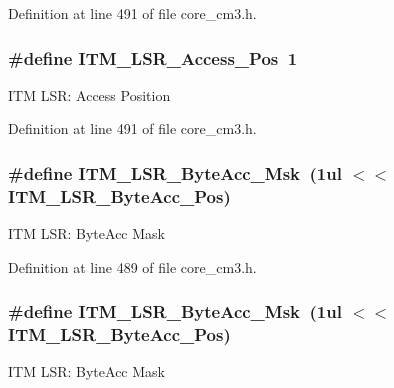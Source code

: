 Definition at line 491 of file core\+\_\+cm3.\+h.

\subsubsection[{\texorpdfstring{I\+T\+M\+\_\+\+L\+S\+R\+\_\+\+Access\+\_\+\+Pos}{ITM_LSR_Access_Pos}}]{\setlength{\rightskip}{0pt plus 5cm}\#define I\+T\+M\+\_\+\+L\+S\+R\+\_\+\+Access\+\_\+\+Pos~1}\hypertarget{group___c_m_s_i_s___c_m3___i_t_m_ga144a49e12b83ad9809fdd2769094fdc0}{}\label{group___c_m_s_i_s___c_m3___i_t_m_ga144a49e12b83ad9809fdd2769094fdc0}
I\+TM L\+SR\+: Access Position 

Definition at line 491 of file core\+\_\+cm3.\+h.

\subsubsection[{\texorpdfstring{I\+T\+M\+\_\+\+L\+S\+R\+\_\+\+Byte\+Acc\+\_\+\+Msk}{ITM_LSR_ByteAcc_Msk}}]{\setlength{\rightskip}{0pt plus 5cm}\#define I\+T\+M\+\_\+\+L\+S\+R\+\_\+\+Byte\+Acc\+\_\+\+Msk~(1ul $<$$<$ I\+T\+M\+\_\+\+L\+S\+R\+\_\+\+Byte\+Acc\+\_\+\+Pos)}\hypertarget{group___c_m_s_i_s___c_m3___i_t_m_ga91f492b2891bb8b7eac5b58de7b220f4}{}\label{group___c_m_s_i_s___c_m3___i_t_m_ga91f492b2891bb8b7eac5b58de7b220f4}
I\+TM L\+SR\+: Byte\+Acc Mask 

Definition at line 489 of file core\+\_\+cm3.\+h.

\subsubsection[{\texorpdfstring{I\+T\+M\+\_\+\+L\+S\+R\+\_\+\+Byte\+Acc\+\_\+\+Msk}{ITM_LSR_ByteAcc_Msk}}]{\setlength{\rightskip}{0pt plus 5cm}\#define I\+T\+M\+\_\+\+L\+S\+R\+\_\+\+Byte\+Acc\+\_\+\+Msk~(1ul $<$$<$ I\+T\+M\+\_\+\+L\+S\+R\+\_\+\+Byte\+Acc\+\_\+\+Pos)}\hypertarget{group___c_m_s_i_s___c_m3___i_t_m_ga91f492b2891bb8b7eac5b58de7b220f4}{}\label{group___c_m_s_i_s___c_m3___i_t_m_ga91f492b2891bb8b7eac5b58de7b220f4}
I\+TM L\+SR\+: Byte\+Acc Mask 

